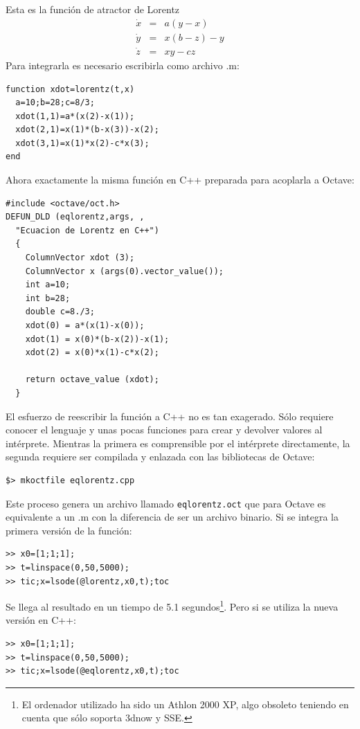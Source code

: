 \documentclass[10pt,letterpaper,conference]{ieeeconfspanish}
\begin{document}
Esta es la función de atractor de Lorentz
\[
\begin{array}{ccl}
\dot x & = & a(y-x)\\
\dot y & = & x(b-z)-y \\
\dot z & = & xy-cz
\end{array}\]
Para integrarla es necesario escribirla como archivo .m:
\begin{verbatim}
function xdot=lorentz(t,x)
  a=10;b=28;c=8/3;
  xdot(1,1)=a*(x(2)-x(1));
  xdot(2,1)=x(1)*(b-x(3))-x(2);
  xdot(3,1)=x(1)*x(2)-c*x(3);
end
\end{verbatim}

Ahora exactamente la misma función en C++ preparada para acoplarla
a Octave:

\begin{verbatim}
#include <octave/oct.h>
DEFUN_DLD (eqlorentz,args, ,
  "Ecuacion de Lorentz en C++")
  {
    ColumnVector xdot (3);
    ColumnVector x (args(0).vector_value());
    int a=10;
    int b=28;
    double c=8./3;
    xdot(0) = a*(x(1)-x(0));
    xdot(1) = x(0)*(b-x(2))-x(1);
    xdot(2) = x(0)*x(1)-c*x(2);

    return octave_value (xdot);
  }
\end{verbatim}

El esfuerzo de reescribir la función a C++ no es tan exagerado.  Sólo
requiere conocer el lenguaje y unas pocas funciones para crear y
devolver valores al intérprete. Mientras la primera es comprensible
por el intérprete directamente, la segunda requiere ser compilada y
enlazada con las bibliotecas de Octave:
\begin{verbatim}
$> mkoctfile eqlorentz.cpp
\end{verbatim}

Este proceso genera un archivo llamado \texttt{eqlorentz.oct} que para
Octave es equivalente a un .m con la diferencia de ser un archivo
binario.  Si se integra la primera versión de la función:
\begin{verbatim}
>> x0=[1;1;1];
>> t=linspace(0,50,5000);
>> tic;x=lsode(@lorentz,x0,t);toc
\end{verbatim}

Se llega al resultado en un tiempo de 5.1 segundos\footnote{El
  ordenador utilizado ha sido un Athlon 2000 XP, algo obsoleto
  teniendo en cuenta que sólo soporta 3dnow y SSE.}. Pero si se
utiliza la nueva versión en C++:
\begin{verbatim}
>> x0=[1;1;1];
>> t=linspace(0,50,5000);
>> tic;x=lsode(@eqlorentz,x0,t);toc
\end{verbatim}
\end{document}
